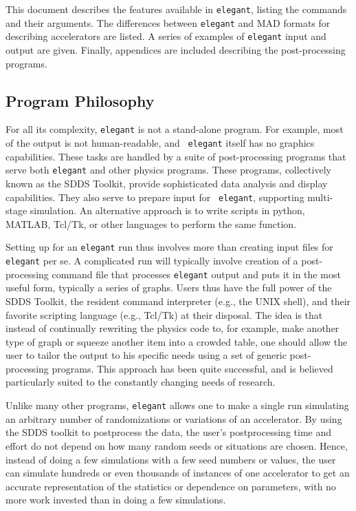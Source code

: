 \documentclass[11pt]{article}
\begin{document}
This document describes the features available in {\tt elegant},
listing the commands and their arguments.  The differences between
{\tt elegant} and MAD formats for describing accelerators are listed.
A series of examples of {\tt elegant} input and output are given.
Finally, appendices are included describing the post-processing
programs.

\subsection{Program Philosophy}

For all its complexity, {\tt elegant} is not a stand-alone program.
For example, most of the output is not human-readable, and {\tt
elegant} itself has no graphics capabilities.  These tasks are handled
by a suite of post-processing programs that serve both {\tt elegant}
and other physics programs.  These programs, collectively known as the
SDDS Toolkit\cite{SDDS1,SDDS2}, provide sophisticated data analysis
and display capabilities.  They also serve to prepare input for {\tt
  elegant}, supporting multi-stage simulation.
An alternative approach is to write scripts in python, MATLAB, Tcl/Tk, or
other languages to perform the same function.

Setting up for an {\tt elegant} run thus involves more than creating
input files for {\tt elegant} per se.  A complicated run will
typically involve creation of a post-processing command file that
processes {\tt elegant} output and puts it in the most useful form,
typically a series of graphs.  Users thus have the full power of the
SDDS Toolkit, the resident command interpreter (e.g., the UNIX shell),
and their favorite scripting language (e.g., Tcl/Tk) at their
disposal. The idea is that instead of continually rewriting the
physics code to, for example, make another type of graph or squeeze
another item into a crowded table, one should allow the user to tailor
the output to his specific needs using a set of generic
post-processing programs.  This approach has been quite successful,
and is believed particularly suited to the constantly changing needs
of research.

Unlike many other programs, {\tt elegant} allows one to make a single
run simulating an arbitrary number of randomizations or variations of
an accelerator.  By using the SDDS toolkit to postprocess the data,
the user's postprocessing time and effort do not depend on how many
random seeds or situations are chosen.  Hence, instead of doing a few
simulations with a few seed numbers or values, the user can simulate
hundreds or even thousands of instances of one accelerator to get an
accurate representation of the statistics or dependence on parameters,
with no more work invested than in doing a few simulations.
\end{document}

